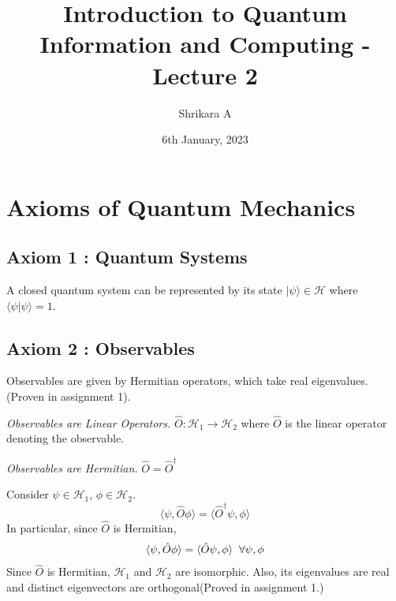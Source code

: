 \documentclass{article}
\title{Introduction to Quantum Information and Computing - Lecture 2}
\author{Shrikara A}
\date{6th January, 2023}
\begin{document}
    

    \maketitle
    \vfill
    \tableofcontents
    \newpage


    \section{Axioms of Quantum Mechanics}
        
        \subsection{Axiom 1 : Quantum Systems}
            A closed quantum system can be represented by its state $| \psi \rangle \in \mathcal{H}$ where $\langle \psi | \psi \rangle = 1$.
        

        \subsection{Axiom 2 : Observables}
            Observables are given by Hermitian operators, which take real eigenvalues. (Proven in assignment 1). 

            \textit{Observables are Linear Operators.} $\hat{O} : \mathcal{H}_1 \rightarrow \mathcal{H}_2$ where $\hat{O}$ is the linear operator denoting the observable. 

            \textit{Observables are Hermitian.} $\hat{O} = \hat{O}^{\dagger}$

            Consider $\psi \in \mathcal{H}_1$, $\phi \in \mathcal{H}_2$.
            \begin{equation*}
                \langle \psi , \hat{O} \phi \rangle = \langle \hat{O}^{\dagger} \psi , \phi \rangle
            \end{equation*}
            In particular, since $\hat{O}$ is Hermitian, 
            \begin{align*}
                \langle \psi , \hat{O} \phi \rangle = \langle \hat{O} \psi , \phi \rangle \hspace{0.2cm}
                \forall \psi, \phi
            \end{align*}
            Since $\hat{O}$ is Hermitian, $\mathcal{H}_1$ and $\mathcal{H}_2$ are isomorphic. Also, its eigenvalues are real and distinct eigenvectors are orthogonal(Proved in assignment 1.)\\
\end{document}
